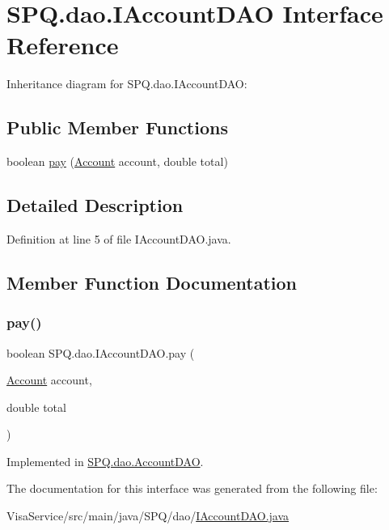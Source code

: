 \hypertarget{interface_s_p_q_1_1dao_1_1_i_account_d_a_o}{}\section{S\+P\+Q.\+dao.\+I\+Account\+D\+AO Interface Reference}
\label{interface_s_p_q_1_1dao_1_1_i_account_d_a_o}


Inheritance diagram for S\+P\+Q.\+dao.\+I\+Account\+D\+AO\+:
\subsection*{Public Member Functions}
\begin{DoxyCompactItemize}
\item 
boolean \mbox{\hyperlink{interface_s_p_q_1_1dao_1_1_i_account_d_a_o_aa1e3f13d419f23fc0cb5c98cd4cc5eb4}{pay}} (\mbox{\hyperlink{class_s_p_q_1_1data_1_1_account}{Account}} account, double total)
\end{DoxyCompactItemize}


\subsection{Detailed Description}


Definition at line 5 of file I\+Account\+D\+A\+O.\+java.



\subsection{Member Function Documentation}
\mbox{\label{interface_s_p_q_1_1dao_1_1_i_account_d_a_o_aa1e3f13d419f23fc0cb5c98cd4cc5eb4}} 
\subsubsection{\texorpdfstring{pay()}{pay()}}
{\footnotesize\ttfamily boolean S\+P\+Q.\+dao.\+I\+Account\+D\+A\+O.\+pay (\begin{DoxyParamCaption}\item[{\mbox{\hyperlink{class_s_p_q_1_1data_1_1_account}{Account}}}]{account,  }\item[{double}]{total }\end{DoxyParamCaption})}



Implemented in \mbox{\hyperlink{class_s_p_q_1_1dao_1_1_account_d_a_o_ad40cd6129f180d4cb235c00756b53930}{S\+P\+Q.\+dao.\+Account\+D\+AO}}.



The documentation for this interface was generated from the following file\+:\begin{DoxyCompactItemize}
\item 
Visa\+Service/src/main/java/\+S\+P\+Q/dao/\mbox{\hyperlink{_i_account_d_a_o_8java}{I\+Account\+D\+A\+O.\+java}}\end{DoxyCompactItemize}
